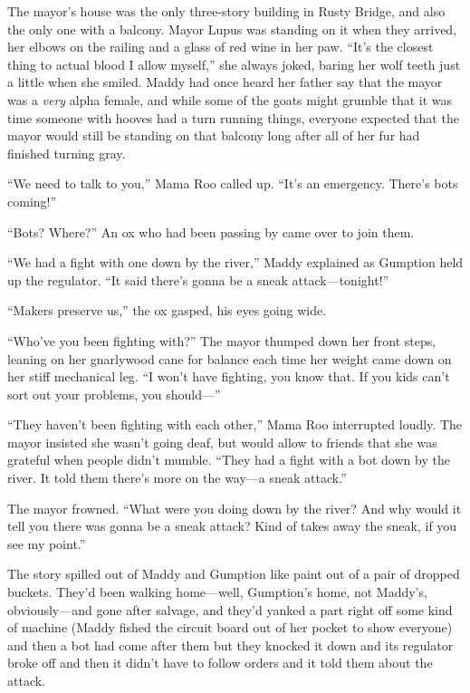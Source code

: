 \documentclass[10pt]{article}
\begin{document}
The mayor's house was the only three-story building in Rusty Bridge, and
also the only one with a balcony. Mayor Lupus was standing on it when
they arrived, her elbows on the railing and a glass of red wine in her
paw. ``It's the closest thing to actual blood I allow myself,'' she
always joked, baring her wolf teeth just a little when she smiled. Maddy
had once heard her father say that the mayor was a \emph{very} alpha
female, and while some of the goats might grumble that it was time
someone with hooves had a turn running things, everyone expected that
the mayor would still be standing on that balcony long after all of her
fur had finished turning gray.

``We need to talk to you,'' Mama Roo called up. ``It's an emergency.
There's bots coming!''

``Bots? Where?'' An ox who had been passing by came over to join them.

``We had a fight with one down by the river,'' Maddy explained as
Gumption held up the regulator. ``It said there's gonna be a sneak
attack---tonight!''

``Makers preserve us,'' the ox gasped, his eyes going wide.

``Who've you been fighting with?'' The mayor thumped down her front
steps, leaning on her gnarlywood cane for balance each time her weight
came down on her stiff mechanical leg. ``I won't have fighting, you know
that. If you kids can't sort out your problems, you should---''

``They haven't been fighting with each other,'' Mama Roo interrupted
loudly. The mayor insisted she wasn't going deaf, but would allow to
friends that she was grateful when people didn't mumble. ``They had a
fight with a bot down by the river. It told them there's more on the
way---a sneak attack.''

The mayor frowned. ``What were you doing down by the river? And why
would it tell you there was gonna be a sneak attack? Kind of takes away
the sneak, if you see my point.''

The story spilled out of Maddy and Gumption like paint out of a pair of
dropped buckets. They'd been walking home---well, Gumption's home, not
Maddy's, obviously---and gone after salvage, and they'd yanked a part
right off some kind of machine (Maddy fished the circuit board out of
her pocket to show everyone) and then a bot had come after them but they
knocked it down and its regulator broke off and then it didn't have to
follow orders and it told them about the attack.
\end{document}
